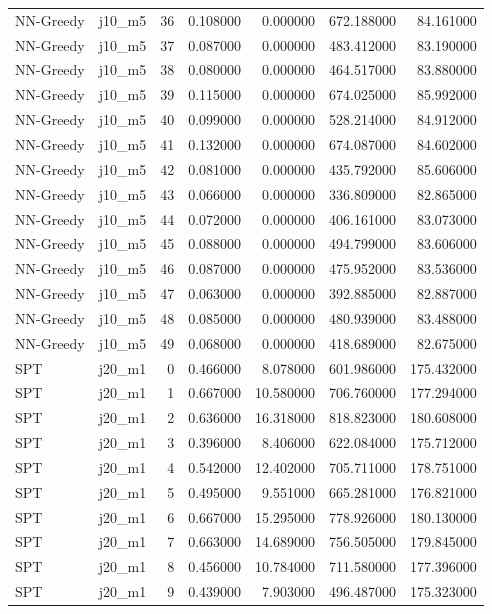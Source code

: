 \begin{tabular}{llrrrrr}
NN-Greedy & j10_m5 & 36 & 0.108000 & 0.000000 & 672.188000 & 84.161000 \\
NN-Greedy & j10_m5 & 37 & 0.087000 & 0.000000 & 483.412000 & 83.190000 \\
NN-Greedy & j10_m5 & 38 & 0.080000 & 0.000000 & 464.517000 & 83.880000 \\
NN-Greedy & j10_m5 & 39 & 0.115000 & 0.000000 & 674.025000 & 85.992000 \\
NN-Greedy & j10_m5 & 40 & 0.099000 & 0.000000 & 528.214000 & 84.912000 \\
NN-Greedy & j10_m5 & 41 & 0.132000 & 0.000000 & 674.087000 & 84.602000 \\
NN-Greedy & j10_m5 & 42 & 0.081000 & 0.000000 & 435.792000 & 85.606000 \\
NN-Greedy & j10_m5 & 43 & 0.066000 & 0.000000 & 336.809000 & 82.865000 \\
NN-Greedy & j10_m5 & 44 & 0.072000 & 0.000000 & 406.161000 & 83.073000 \\
NN-Greedy & j10_m5 & 45 & 0.088000 & 0.000000 & 494.799000 & 83.606000 \\
NN-Greedy & j10_m5 & 46 & 0.087000 & 0.000000 & 475.952000 & 83.536000 \\
NN-Greedy & j10_m5 & 47 & 0.063000 & 0.000000 & 392.885000 & 82.887000 \\
NN-Greedy & j10_m5 & 48 & 0.085000 & 0.000000 & 480.939000 & 83.488000 \\
NN-Greedy & j10_m5 & 49 & 0.068000 & 0.000000 & 418.689000 & 82.675000 \\
SPT & j20_m1 & 0 & 0.466000 & 8.078000 & 601.986000 & 175.432000 \\
SPT & j20_m1 & 1 & 0.667000 & 10.580000 & 706.760000 & 177.294000 \\
SPT & j20_m1 & 2 & 0.636000 & 16.318000 & 818.823000 & 180.608000 \\
SPT & j20_m1 & 3 & 0.396000 & 8.406000 & 622.084000 & 175.712000 \\
SPT & j20_m1 & 4 & 0.542000 & 12.402000 & 705.711000 & 178.751000 \\
SPT & j20_m1 & 5 & 0.495000 & 9.551000 & 665.281000 & 176.821000 \\
SPT & j20_m1 & 6 & 0.667000 & 15.295000 & 778.926000 & 180.130000 \\
SPT & j20_m1 & 7 & 0.663000 & 14.689000 & 756.505000 & 179.845000 \\
SPT & j20_m1 & 8 & 0.456000 & 10.784000 & 711.580000 & 177.396000 \\
SPT & j20_m1 & 9 & 0.439000 & 7.903000 & 496.487000 & 175.323000 \\

\end{tabular}
